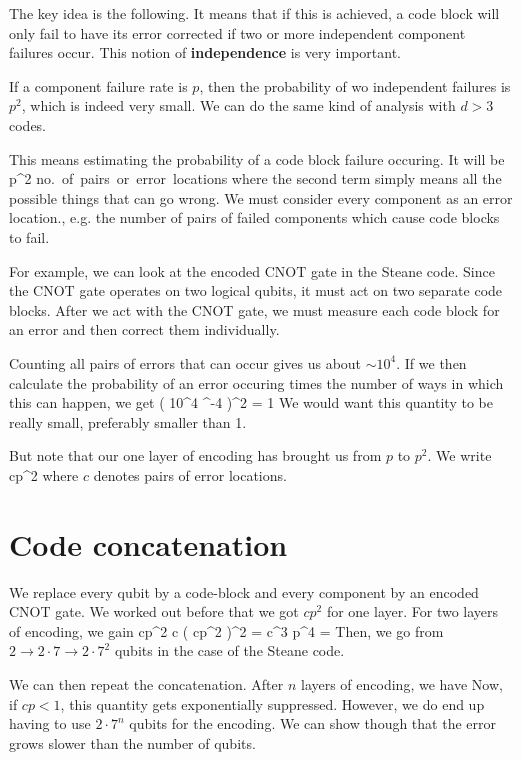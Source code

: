 The key idea is the following. It means that if this is achieved, a code block will only fail to have its error corrected if two or more independent component failures occur. This notion of \textbf{independence} is very important. 

If a component failure rate is $p$, then the probability of wo independent failures is $p^2$, which is indeed very small. We can do the same kind of analysis with $d>3$ codes. 

This means estimating the probability of a code block failure occuring. It will be 
\beq
p^2 \times \mbox{no. of pairs or error locations}
\eeq
where the second term simply means all the possible things that can go wrong. We must consider every component as an error location., e.g. the number of pairs of failed components which cause code blocks to fail.

For example, we can look at the encoded CNOT gate in the Steane code. Since the CNOT gate operates on two logical qubits, it must act on two separate code blocks. After we act with the CNOT gate, we must measure each code block for an error and then correct them individually. 

Counting all pairs of errors that can occur gives us about $\sim 10^4$. If we then calculate the probability of an error occuring times the number of ways in which this can happen, we get
\beq
\left( 10^4 ^{-4} \right)^2 = 1
\eeq
We would want this quantity to be really small, preferably smaller than 1. 

But note that our one layer of encoding has brought us from $p$ to $p^2$. We write
\beq
cp^2
\eeq
where $c$ denotes pairs of error locations. 

\section{Code concatenation}
We replace every qubit by a code-block and every component by an encoded CNOT gate. We worked out before that we got $cp^2$ for one layer. For two layers of encoding, we gain
\beq
cp^2 \rightarrow c \left( cp^2 \right)^2 = c^3 p^4 = \eeq
Then, we go from $2 \rightarrow 2\cdot 7 \rightarrow 2 \cdot 7^2$ qubits in the case of the Steane code. 

We can then repeat the concatenation. After $n$ layers of encoding, we have
\beq
{}
\eeq
Now, if $cp<1$, this quantity gets exponentially suppressed. However, we do end up having to use $2\cdot 7^n$ qubits for the encoding. We can show though that the error grows slower than the number of qubits. 

